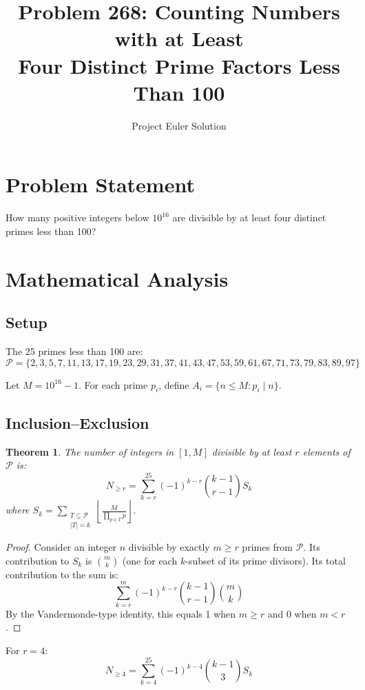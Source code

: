 \documentclass[12pt]{article}
\title{Problem 268: Counting Numbers with at Least\\Four Distinct Prime Factors Less Than 100}
\author{Project Euler Solution}
\date{}
\newtheorem{theorem}{Theorem}
\theoremstyle{definition}
\begin{document}
\maketitle

\section{Problem Statement}
How many positive integers below $10^{16}$ are divisible by at least four distinct primes less than 100?

\section{Mathematical Analysis}

\subsection{Setup}
The 25 primes less than 100 are:
\[ \mathcal{P} = \{2, 3, 5, 7, 11, 13, 17, 19, 23, 29, 31, 37, 41, 43, 47, 53, 59, 61, 67, 71, 73, 79, 83, 89, 97\} \]

Let $M = 10^{16} - 1$. For each prime $p_i$, define $A_i = \{n \leq M : p_i \mid n\}$.

\subsection{Inclusion--Exclusion}

\begin{theorem}
The number of integers in $[1, M]$ divisible by at least $r$ elements of $\mathcal{P}$ is:
\[ N_{\geq r} = \sum_{k=r}^{25} (-1)^{k-r} \binom{k-1}{r-1} S_k \]
where $S_k = \sum_{\substack{T \subseteq \mathcal{P} \\ |T|=k}} \left\lfloor \frac{M}{\prod_{p \in T} p} \right\rfloor$.
\end{theorem}

\begin{proof}
Consider an integer $n$ divisible by exactly $m \geq r$ primes from $\mathcal{P}$. Its contribution to $S_k$ is $\binom{m}{k}$ (one for each $k$-subset of its prime divisors). Its total contribution to the sum is:
\[ \sum_{k=r}^{m} (-1)^{k-r} \binom{k-1}{r-1} \binom{m}{k} \]
By the Vandermonde-type identity, this equals 1 when $m \geq r$ and 0 when $m < r$.
\end{proof}

For $r = 4$:
\[ N_{\geq 4} = \sum_{k=4}^{25} (-1)^{k-4} \binom{k-1}{3} S_k \]
\end{document}
